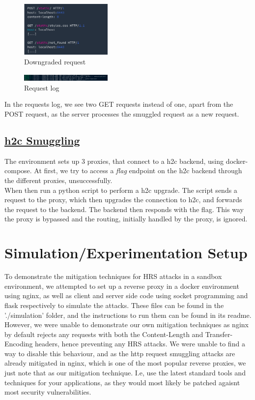 \documentclass[conference]{IEEEtran}
\begin{document}
\begin{figure}[htbp]
	\centering
	\includegraphics[width=0.4\textwidth]{results/downgrade.png}
	\caption{Downgraded request}
	\label{fig:te.cl.detection}
\end{figure}


\begin{figure}[htbp]
	\centering
	\includegraphics[width=0.4\textwidth]{results/log.png}
	\caption{Request log}
	\label{fig:te.cl.detection}
\end{figure}

In the requests log, we see two GET requests instead of one, apart from the POST request, as the server processes the smuggled request as a new request.

\subsection*{\href{https://github.com/BishopFox/h2csmuggler}{h2c Smuggling}}
The environment sets up 3 proxies, that connect to a h2c backend, using docker-compose. At first, we try to access a \textit{flag} endpoint on the h2c backend through the different proxies, unsuccessfully. \\
When then run a python script to perform a h2c upgrade. The script sends a request to the proxy, which then upgrades the connection to h2c, and forwards the request to the backend. The backend then responds with the flag. This way the proxy is bypassed and the routing, initially handled by the proxy, is ignored.\\


\section{Simulation/Experimentation Setup}
To demonstrate the mitigation techniques for HRS attacks in a sandbox environment, we attempted to set up a reverse proxy in a docker environment using nginx, as well as client and server side code using socket programming and flask respectively to simulate the attacks. These files can be found in the './simulation' folder, and the instructions to run them can be found in its readme.  However, we were unable to demonstrate our own mitigation techniques as nginx by default rejects any requests with both the Content-Length and Transfer-Encoding headers, hence preventing any HRS attacks. We were unable to find a way to disable this behaviour, and as the http request smuggling attacks are already mitigated in nginx, which is one of the most popular reverse proxies, we just note that as our mitigation technique. I.e, use the latest standard tools and techniques for your applications, as they would most likely be patched agaisnt most security vulnerabilities.
\end{document}
